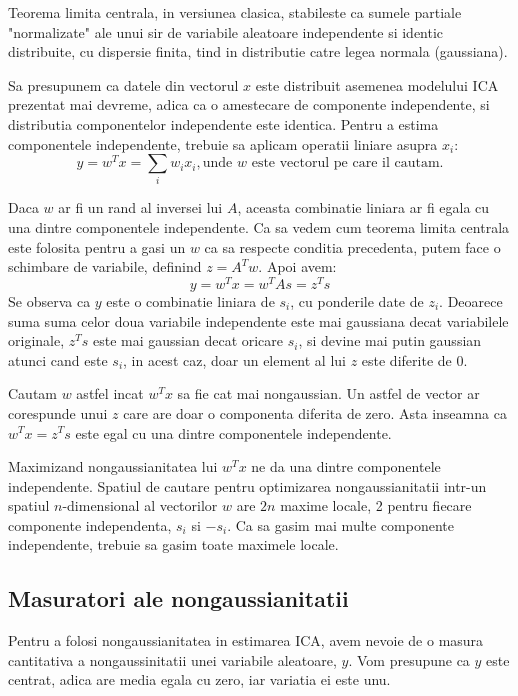 \documentclass[12pt,oneside]{article}
\begin{document}
 Teorema limita centrala, in versiunea clasica, stabileste ca sumele partiale "normalizate" ale unui sir de variabile aleatoare independente si identic distribuite, cu dispersie finita, tind in distributie catre legea normala (gaussiana).\cite{paltanea}

 Sa presupunem ca datele din vectorul $x$ este distribuit asemenea modelului ICA prezentat mai devreme, adica ca o amestecare de componente independente, si distributia componentelor independente este  identica. Pentru a estima componentele independente, trebuie sa aplicam operatii liniare asupra $x_i$:
 \begin{equation}
	y=w^Tx=\sum_{i}w_ix_i, \text{unde $w$ este vectorul pe care il cautam.}
 \end{equation}

 Daca $w$ ar fi un rand al inversei lui $A$, aceasta combinatie liniara ar fi egala cu una dintre componentele independente. Ca sa vedem cum teorema limita centrala este folosita pentru a gasi un $w$ ca sa respecte conditia precedenta, putem face o schimbare de variabile, definind $z=A^Tw$. Apoi avem:
 \begin{equation}
	 y=w^Tx=w^TAs=z^Ts
 \end{equation}
 Se observa ca $y$ este o combinatie liniara de $s_i$, cu ponderile date de $z_i$. Deoarece suma suma celor doua variabile independente este mai gaussiana decat variabilele originale, $z^Ts$ este mai gaussian decat oricare $s_i$, si devine mai putin gaussian atunci cand este $s_i$, in acest caz, doar un element al lui $z$ este diferite de 0. 
 
 Cautam $w$ astfel incat $w^Tx$ sa fie cat mai nongaussian. Un astfel de vector ar corespunde unui $z$ care are doar o componenta diferita de zero. Asta inseamna ca $w^Tx=z^Ts$ este egal cu una dintre componentele independente.

 Maximizand nongaussianitatea lui $w^Tx$ ne da una dintre componentele independente. Spatiul de cautare pentru optimizarea nongaussianitatii intr-un spatiul $n$-dimensional al vectorilor $w$ are $2n$ maxime locale, 2 pentru fiecare componente independenta, $s_i$ si $-s_i$. Ca sa gasim mai multe componente independente, trebuie sa gasim toate maximele locale.  
\newpage
\subsection{Masuratori ale nongaussianitatii}
Pentru a folosi nongaussianitatea in estimarea ICA, avem nevoie de o masura cantitativa a nongaussinitatii unei variabile aleatoare, $y$. Vom presupune ca $y$ este centrat, adica are media egala cu zero, iar variatia ei este unu. 
\end{document}
